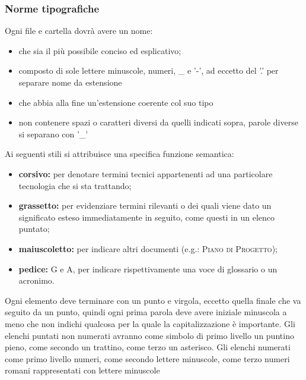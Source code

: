         \subsubsection{Norme tipografiche}
                Ogni file e cartella dovrà avere un nome:
                \begin{itemize}
                    \item che sia il più possibile conciso ed esplicativo;
                    \item composto di sole lettere minuscole, numeri, \_ e '-', ad eccetto del '.' per separare nome da estensione
                    \item che abbia alla fine un'estensione coerente col suo tipo
                    \item non contenere spazi o caratteri diversi da quelli indicati sopra, parole diverse si separano con '\_'
                \end{itemize}
                Ai seguenti stili si attribuisce una specifica funzione semantica:
                \begin{itemize}
                    \item \textbf{corsivo: }per denotare termini tecnici appartenenti ad una particolare tecnologia che si sta trattando;
                    \item \textbf{grassetto: }per evidenziare termini rilevanti o dei quali viene dato un significato esteso immediatamente in seguito, come questi in un elenco puntato;
                    \item \textbf{maiuscoletto: }per indicare altri documenti (e.g.: \textsc{Piano di Progetto});
                    \item \textbf{pedice: } G e A, per indicare rispettivamente una voce di glossario o un acronimo.
                \end{itemize}
                Ogni elemento deve terminare con un punto e virgola, eccetto quella finale che va seguito da un punto, quindi ogni prima parola deve avere iniziale minuscola a meno che non indichi qualcosa per la quale la capitalizzazione è importante. Gli elenchi puntati non numerati avranno come simbolo di primo livello un puntino pieno, come secondo un trattino, come terzo un asterisco. Gli elenchi numerati come primo livello numeri, come secondo lettere minuscole, come terzo numeri romani rappresentati con lettere minuscole
